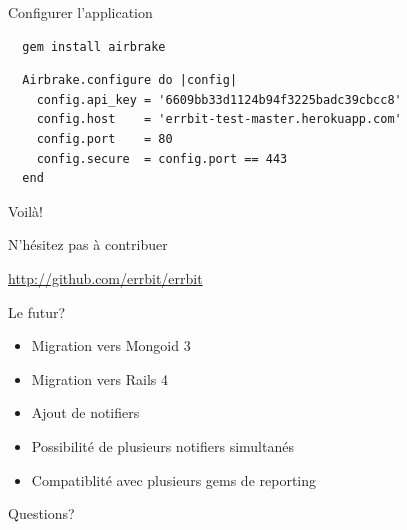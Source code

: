 \documentclass{beamer}
\begin{document}
\begin{frame}[fragile]
  \centering
  \Huge
  Configurer l'application
  \small

  \begin{verbatim}
  gem install airbrake
  \end{verbatim}

  \begin{verbatim}
  Airbrake.configure do |config|
    config.api_key = '6609bb33d1124b94f3225badc39cbcc8'
    config.host    = 'errbit-test-master.herokuapp.com'
    config.port    = 80
    config.secure  = config.port == 443
  end
  \end{verbatim}
\end{frame}

\begin{frame}
  \centering
  \Huge
  Voilà!
\end{frame}

\begin{frame}
  \centering
  \Huge
  N'hésitez pas à contribuer
  \par
  \url{http://github.com/errbit/errbit}
\end{frame}

\begin{frame}
  \centering
  \Huge
  Le futur?
  \normalsize
  \begin{itemize}
    \item Migration vers Mongoid 3
    \item Migration vers Rails 4
    \item Ajout de notifiers
    \item Possibilité de plusieurs notifiers simultanés
    \item Compatiblité avec plusieurs gems de reporting
  \end{itemize}
\end{frame}

\begin{frame}
  \centering
  \Huge
  Questions?
\end{frame}
\end{document}
